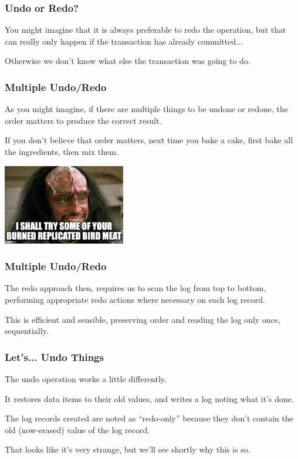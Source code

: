 \begin{frame}
\frametitle{Undo or Redo?}

You might imagine that it is always preferable to redo the operation, but that can really only happen if the transaction has already committed... 

Otherwise we don't know what else the transaction was going to do.


\end{frame}


\begin{frame}
\frametitle{Multiple Undo/Redo}
As you might imagine, if there are multiple things to be undone or redone, the order matters to produce the correct result. 

If you don't believe that order matters, next time you bake a cake, first bake all the ingredients, then mix them. 

\begin{center}
	\includegraphics[width=0.4\textwidth]{images/kurn.jpg}
\end{center}

\end{frame}


\begin{frame}
\frametitle{Multiple Undo/Redo}

The redo approach then, requires us to scan the log from top to bottom, performing appropriate redo actions where necessary on each log record. 

This is efficient and sensible, preserving order and reading the log only once, sequentially.

\end{frame}

\begin{frame}
\frametitle{Let's... Undo Things}

The undo operation works a little differently. 

It restores data items to their old values, and writes a log noting what it's done. 

The log records created are noted as ``redo-only'' because they don't contain the old (now-erased) value of the log record.

That looks like it's very strange, but we'll see shortly why this is so.

\end{frame}



